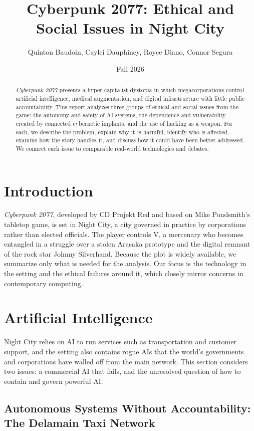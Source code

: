 \documentclass{article}%
\title{Cyberpunk 2077: Ethical and Social Issues in Night City}
\author{Quinton Baudoin, Caylei Dauphiney, Royce Diano, Connor Segura}
\date{Fall 2026} %
\begin{document}
\maketitle%

\begin{abstract}
\textit{Cyberpunk 2077} presents a hyper-capitalist dystopia in which megacorporations control artificial intelligence, medical augmentation, and digital infrastructure with little public accountability. This report analyzes three groups of ethical and social issues from the game: the autonomy and safety of AI systems, the dependence and vulnerability created by connected cybernetic implants, and the use of hacking as a weapon. For each, we describe the problem, explain why it is harmful, identify who is affected, examine how the story handles it, and discuss how it could have been better addressed. We connect each issue to comparable real-world technologies and debates.
\end{abstract}

\section{Introduction}
\textit{Cyberpunk 2077}, developed by CD Projekt Red and based on Mike Pondsmith's tabletop game, is set in Night City, a city governed in practice by corporations rather than elected officials. The player controls V, a mercenary who becomes entangled in a struggle over a stolen Arasaka prototype and the digital remnant of the rock star Johnny Silverhand. Because the plot is widely available, we summarize only what is needed for the analysis. Our focus is the technology in the setting and the ethical failures around it, which closely mirror concerns in contemporary computing.

\section{Artificial Intelligence}
Night City relies on AI to run services such as transportation and customer support, and the setting also contains rogue AIs that the world's governments and corporations have walled off from the main network. This section considers two issues: a commercial AI that fails, and the unresolved question of how to contain and govern powerful AI.

\subsection{Autonomous Systems Without Accountability: The Delamain Taxi Network}
\end{document}
